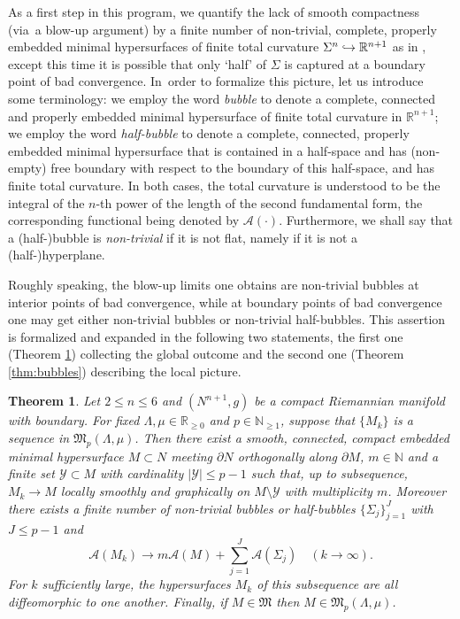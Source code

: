 \documentclass[JEP,XML,SOM,Unicode]{cedram}
\let\mathcal\mathscr
\newcounter{cas}
\newcommand{\hto}{\mathrel{\lhook\joinrel\to}}
\newtheorem{thm}{Theorem}
\theoremstyle{definition}
\newcommand{\R}{\mathbb{R}}
\newcommand{\N}{\mathbb{N}}
\let\emb\hto
\begin{document}
As a first step in this program, we quantify the lack of smooth compactness (via~a blow-up argument) by a finite number of non-trivial, complete, properly embedded minimal hypersurfaces of finite total curvature $\Sigma^n\emb \R^{n+1}$ as in \cite{BS17}, except this time it is possible that only `half' of $\Sigma$ is captured at a boundary point of bad convergence. In~order to formalize this picture, let us introduce some terminology:
we employ the word \emph{bubble} to denote a complete, connected and properly embedded minimal hypersurface of finite total curvature in $\R^{n+1}$; we employ the word \emph{half-bubble} to denote a complete, connected, properly embedded minimal hypersurface that is contained in a half-space and has (non-empty) free boundary with respect to the boundary of this half-space, and has finite total curvature. In both cases, the total curvature is understood to be the integral of the $n$-th power of the length of the second fundamental form, the corresponding functional being denoted by $\mathcal{A}(\cdot)$. Furthermore, we shall say that a (half-)bubble is \emph{non-trivial} if it is not flat, namely if it is not a (half-)hyperplane.

Roughly speaking, the blow-up limits one obtains are non-trivial bubbles at interior points of bad convergence, while at boundary points of bad convergence one may get either non-trivial bubbles or non-trivial half-bubbles. This assertion is formalized and expanded in the following two statements, the first one (Theorem \ref{thm:quant}) collecting the global outcome and the second one (Theorem \ref{thm:bubbles}) describing the local picture.

\begin{thm}\label{thm:quant}
Let $2\leq n\leq 6$ and $(N^{n+1},g)$ be a compact Riemannian manifold with boundary. For fixed $\Lambda, \mu\in \R_{\geq 0}$ and $p\in \N_{\geq 1}$, suppose that $\{M_k\}$ is a sequence in $\mathfrak{M}_p(\Lambda, \mu)$. Then there exist a smooth, connected, compact embedded minimal hypersurface $M\subset N$ meeting $\partial N$ orthogonally along $\partial M$, $m\in \mathbb{N}$ and a finite set $\mathcal{Y}\subset M$ with cardinality $|\mathcal{Y}|\leq p-1$ such that, up to subsequence, $M_k \to M$ locally smoothly and graphically on $M\setminus \mathcal{Y}$ with multiplicity $m$.
Moreover there exists a finite number of non-trivial bubbles or half-bubbles $\{\Sigma_j\}_{j=1}^J$ with $J\leq p-1$ and
\[
\mathcal{A}(M_k)\to m\mathcal{A}(M) + \sum_{j=1}^J \mathcal{A}(\Sigma_j) \quad (k\to\infty).
\]
For $k$ sufficiently large, the hypersurfaces $M_k$ of this subsequence are all diffeomorphic to one another. Finally, if $M\in\mathfrak{M}$ then $M\in\mathfrak{M}_{p}(\Lambda,\mu)$.
\end{thm}
\end{document}
